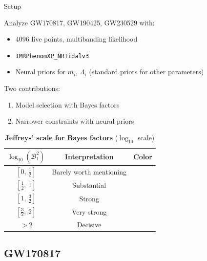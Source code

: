 \documentclass[usenames,dvipsnames,t]{beamer}
\begin{document}
\begin{frame}{Setup}

  \def\x{3mm}

  Analyze GW170817, GW190425, GW230529 with:
  \begin{itemize}
    \item $4096$ live points, multibanding likelihood
    
    \item \texttt{IMRPhenomXP\_NRTidalv3}
    
    \item Neural priors for $m_i$, $\Lambda_i$ (standard priors for other parameters)
  \end{itemize}

  \vspace{\x}

  Two contributions:
  \begin{enumerate}
    \item Model selection with Bayes factors
    \item Narrower constraints with neural priors
  \end{enumerate}

  \vspace{\x}

  \begin{table}
    \centering
    \caption*{\textbf{Jeffreys' scale for Bayes factors} ($\log_{10}$ scale)}
    \small
    \begin{tabular}{ccc}
      \hline
      $\log_{10}(\mathcal{B}_1^2)$ & Interpretation & Color \\
      \hline
      $[0,\, \tfrac{1}{2}]$ & Barely worth mentioning & \cellcolor{jeffreysred1} \\
      $[\tfrac{1}{2},\, 1]$ & Substantial & \cellcolor{jeffreysred2} \\
      $[1,\, \tfrac{3}{2}]$ & Strong & \cellcolor{jeffreysred3} \\
      $[\tfrac{3}{2},\, 2]$ & Very strong & \cellcolor{jeffreysred4} \\
      $> 2$ & Decisive & \cellcolor{jeffreysred5} \\
      \hline
    \end{tabular}
  \end{table}

\end{frame}

\subsection{GW170817}
\end{document}
